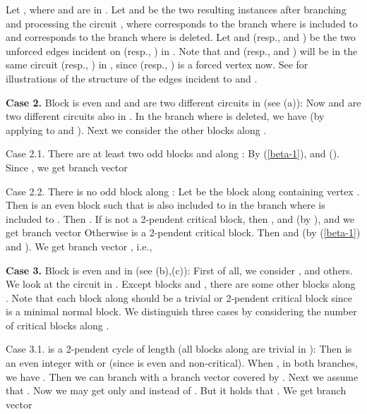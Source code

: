 \documentclass[runningheads]{llncs}
\begin{document}
 Let  ,
where  and  are in . Let  and  be the two resulting instances after branching and processing the circuit , where  corresponds to the branch where  is included to  and  corresponds to the branch where  is deleted. Let  and  (resp.,  and ) be the two unforced edges incident on  (resp., ) in . Note that  and  (resp.,  and ) will be in the same circuit  (resp., ) in , since  (resp., ) is a forced vertex now.
See  for illustrations of the structure of the edges incident to  and .
\vspace{-0mm}\vspace{-0mm}


{\bf Case 2.} Block  is even and  and  are two different circuits in 
(see (a)):
Now  and  are two different circuits also  in .
In the branch where  is deleted, we have
  (by applying  to  and ).
Next we consider the other blocks along .

Case 2.1. There are at least two odd blocks  and  along :
By (\ref{beta-1}),  and  ().
Since , we get branch vector

Case 2.2. There is no odd block along :
 Let  be the block along  containing vertex .
Then  is an even block
such that  is also included to  in the branch
 where  is included to .
Then .
If  is not a 2-pendent critical block, then ,  and  (by ), and we get branch vector
Otherwise  is a 2-pendent critical block. Then 
and  (by (\ref{beta-1}) and ).
We get branch vector
, i.e.,

{\bf Case 3.} Block  is even and  in  (see (b),(c)):
 First of all, we consider ,  and others.
We look at the circuit  in .
 Except blocks  and , there are some other blocks along .
Note that each block  along  should be a trivial or 2-pendent critical block since  is a minimal normal block.
We distinguish three cases by considering the number of critical blocks along .

Case 3.1.  is a 2-pendent cycle of length  (all blocks along  are trivial in ):
Then  is an even integer with  or    (since  is even and non-critical). When , in both branches, we have
.
Then we can branch with a branch vector   covered by .
Next we assume that .
Now we may  get only  and  instead of .
 But it holds that .
We get branch vector
\end{document}
